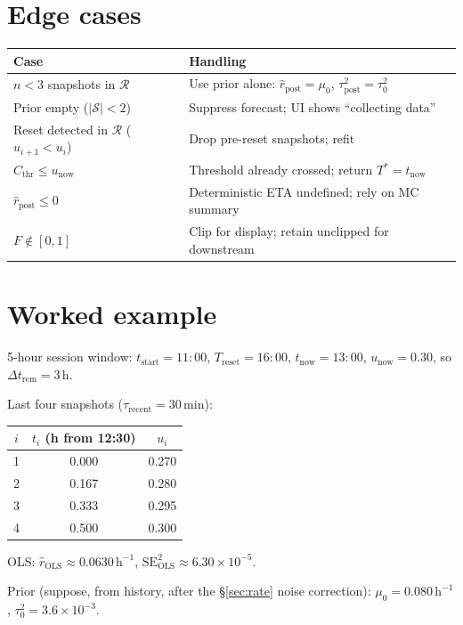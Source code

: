\documentclass[11pt]{article}
\newcommand{\rpost}{\hat r_{\text{post}}}
\newcommand{\taupostsq}{\tau_{\text{post}}^2}
\newcommand{\tauzerosq}{\tau_0^2}
\newcommand{\rols}{\hat r_{\text{OLS}}}
\newcommand{\seolssq}{\mathrm{SE}_{\text{OLS}}^2}
\newcommand{\unow}{u_{\text{now}}}
\newcommand{\tnow}{t_{\text{now}}}
\newcommand{\Treset}{T_{\text{reset}}}
\newcommand{\Dtrem}{\Delta t_{\text{rem}}}
\newcommand{\Cthr}{C_{\text{thr}}}
\newcommand{\taurecent}{\tau_{\text{recent}}}
\newcommand{\Tstar}{T^\ast}
\begin{document}
\section{Edge cases}

\begin{center}
\begin{tabular}{@{}p{}p{}@{}}
\toprule
Case & Handling \\
\midrule
$n < 3$ snapshots in $\mathcal{R}$
  & Use prior alone: $\rpost = \mu_0$, $\taupostsq = \tauzerosq$ \\
Prior empty ($\lvert\mathcal{S}\rvert < 2$)
  & Suppress forecast; UI shows ``collecting data'' \\
Reset detected in $\mathcal{R}$ ($u_{i+1} < u_i$)
  & Drop pre-reset snapshots; refit \\
$\Cthr \leq \unow$
  & Threshold already crossed; return $\Tstar = \tnow$ \\
$\rpost \leq 0$
  & Deterministic ETA undefined; rely on MC summary \\
$F \notin [0, 1]$
  & Clip for display; retain unclipped for downstream \\
\bottomrule
\end{tabular}
\end{center}

\section{Worked example}

5-hour session window: $t_{\text{start}} = 11{:}00$, $\Treset = 16{:}00$,
$\tnow = 13{:}00$, $\unow = 0.30$, so $\Dtrem = 3$\,h.

Last four snapshots ($\taurecent = 30$\,min):

\begin{center}
\begin{tabular}{@{}ccc@{}}
\toprule
$i$ & $t_i$ (h from 12{:}30) & $u_i$ \\
\midrule
1 & 0.000 & 0.270 \\
2 & 0.167 & 0.280 \\
3 & 0.333 & 0.295 \\
4 & 0.500 & 0.300 \\
\bottomrule
\end{tabular}
\end{center}

OLS: $\rols \approx 0.0630\,\mathrm{h}^{-1}$, $\seolssq \approx 6.30 \times
10^{-5}$.

Prior (suppose, from history, after the \S\ref{sec:rate} noise correction):
$\mu_0 = 0.080\,\mathrm{h}^{-1}$, $\tauzerosq = 3.6 \times 10^{-3}$.
\end{document}
